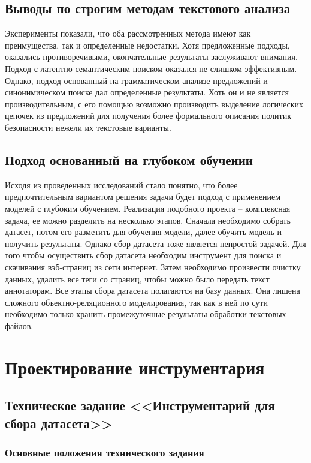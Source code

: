 \documentclass[../main]{subfiles}
\begin{document}
\subsection{Выводы по строгим методам текстового анализа}

Эксперименты показали, что оба рассмотренных метода имеют как преимущества, так и определенные недостатки. Хотя предложенные подходы, оказались противоречивыми, окончательные результаты заслуживают внимания. Подход с латентно-семантическим поиском оказался не слишком эффективным. Однако, подход основанный на грамматическом анализе предложений и синонимическом поиске дал определенные результаты. Хоть он и не является производительным, с его помощью возможно производить выделение логических цепочек из предложений для получения более формального описания политик безопасности нежели их текстовые варианты.

\subsection{Подход основанный на глубоком обучении}
Исходя из проведенных исследований стало понятно, что более предпочтительным вариантом решения задачи будет подход с применением моделей с глубоким обучением. Реализация подобного проекта -- комплексная задача, ее можно разделить на несколько этапов. Сначала необходимо собрать датасет, потом его разметить для обучения модели, далее обучить модель и получить результаты. Однако сбор датасета тоже является непростой задачей. Для того чтобы осуществить сбор датасета необходим инструмент для поиска и скачивания вэб-страниц из сети интернет. Затем необходимо произвести очистку данных, удалить все теги со страниц, чтобы можно было передать текст аннотаторам. Все этапы сбора датасета полагаются на базу данных. Она лишена сложного объектно-реляционного моделирования, так как в ней по сути необходимо только хранить промежуточные результаты обработки текстовых файлов.

\newpage
\section{Проектирование инструментария}

\subsection{Техническое задание <<Инструментарий для сбора датасета>>}

\subsubsection{Основные положения технического задания}
\end{document}
